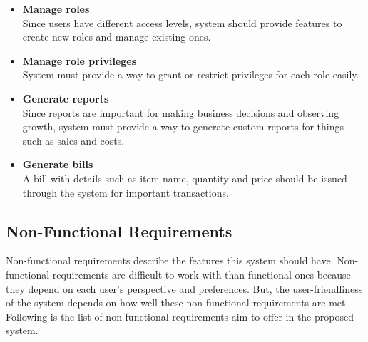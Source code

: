 \documentclass[12pt]{report}
\begin{document}
\begin{itemize}
	\item {\bf{Manage roles}} \\
	      Since users have different access levels, system should provide features to create new roles and manage existing ones.

	\item {\bf{Manage role privileges}} \\
	      System must provide a way to grant or restrict privileges for each role easily.

	\item {\bf{Generate reports}} \\
	      Since reports are important for making business decisions and observing growth, system must provide a way to generate custom reports for things such as sales and costs.

	\item {\bf{Generate bills}} \\
	      A bill with details such as item name, quantity and price should be issued through the system for important transactions.

\end{itemize}

\subsection{Non-Functional Requirements}
Non-functional requirements describe the features this system should have. Non-functional requirements are difficult to work with than functional ones because they depend on each user's perspective and preferences. But, the user-friendliness of the system depends on how well these non-functional requirements are met. Following is the list of non-functional requirements aim to offer in the proposed system.

\end{document}
